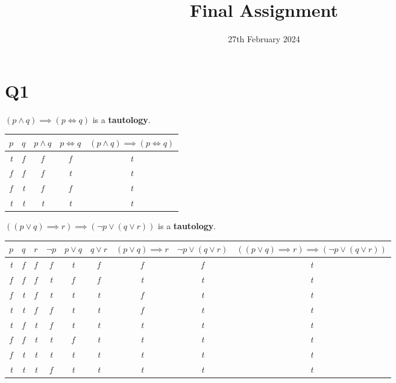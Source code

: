 \documentclass{article}
\title{\vspace{-2.0cm}Final Assignment}
\date{\vspace{-1.0cm}27th February 2024}
\begin{document}
\vspace{-1cm}
\maketitle

\section*{Q1}

$(p \land q) \implies (p \iff q)$ is a \textbf{tautology}.

\begin{table}[h!]
\begin{tabular}{|c c c c c|} 
\hline 
$p$ & $q$ & $p \land q$ & $p \iff q$ & $(p \land q) \implies (p \iff q)$ \\
\hline
\em{t} & \em{f} & \em{f} & \em{f} & \em{t}  \\ 
\em{f} & \em{f} & \em{f} & \em{t} & \em{t}  \\
\em{f} & \em{t} & \em{f} & \em{f} & \em{t}  \\
\em{t} & \em{t} & \em{t} & \em{t} & \em{t}  \\
\hline
\end{tabular}
\end{table}

\hspace{-0.6cm} $((p \lor q) \implies r) \implies ( \lnot p \lor ( q \lor r ))$ is a \textbf{tautology}.

\begin{table}[h!]
\begin{tabular}{|c c c c c c c c c|} 
\hline 
$p$ & $q$ & $r$ & $\lnot p$ & $p \lor q$ & $q \lor r$ & $(p \lor q) \implies r$ & $\lnot p \lor (q \lor r)$ & $((p \lor q) \implies r) \implies (\lnot p \lor (q \lor r))$ \\
\hline
\em{t} & \em{f} & \em{f} & \em{f} & \em{t} & \em{f} & \em{f} & \em{f} & \em{t}  \\ 
\em{f} & \em{f} & \em{f} & \em{t} & \em{f} & \em{f} & \em{t} & \em{t} & \em{t}  \\
\em{f} & \em{t} & \em{f} & \em{t} & \em{t} & \em{t} & \em{f} & \em{t} & \em{t}  \\
\em{t} & \em{t} & \em{f} & \em{f} & \em{t} & \em{t} & \em{f} & \em{t} & \em{t}  \\
\em{t} & \em{f} & \em{t} & \em{f} & \em{t} & \em{t} & \em{t} & \em{t} & \em{t}  \\ 
\em{f} & \em{f} & \em{t} & \em{t} & \em{f} & \em{t} & \em{t} & \em{t} & \em{t}  \\
\em{f} & \em{t} & \em{t} & \em{t} & \em{t} & \em{t} & \em{t} & \em{t} & \em{t}  \\
\em{t} & \em{t} & \em{t} & \em{f} & \em{t} & \em{t} & \em{t} & \em{t} & \em{t}  \\
\hline
\end{tabular}
\end{table}
\end{document}
